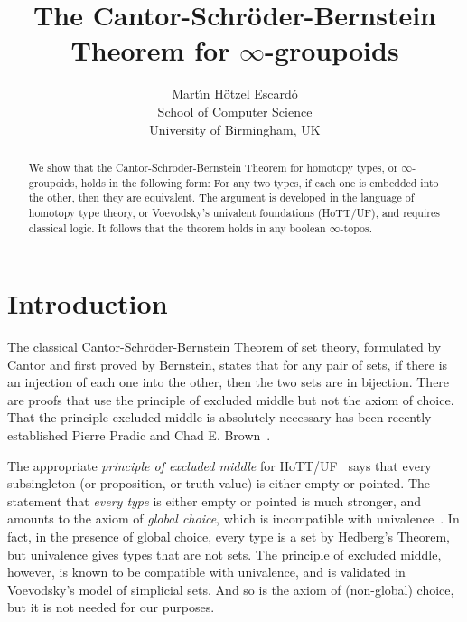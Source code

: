 \documentclass{article}
\title{The Cantor-Schr\"oder-Bernstein Theorem for $\infty$-groupoids}
\author{Mart\'{\i}n H\"otzel Escard\'o
  \\ {\small School of Computer Science}
  \\ {\small University of Birmingham, UK}}
\theoremstyle{definition}
\begin{document}
\maketitle

\begin{abstract}
  We show that the Cantor-Schr\"oder-Bernstein Theorem for homotopy
  types, or $\infty$-groupoids, holds in the following form: For any
  two types, if each one is embedded into the other, then they are
  equivalent. The argument is developed in the language of homotopy
  type theory, or Voevodsky's univalent foundations (HoTT/UF), and
  requires classical logic. It follows that the theorem holds in any
  boolean $\infty$-topos.
\end{abstract}

\section{Introduction}

The classical Cantor-Schr\"oder-Bernstein Theorem of set theory,
formulated by Cantor and first proved by Bernstein, states that for
any pair of sets, if there is an injection of each one into the other,
then the two sets are in bijection.
%
There are proofs that use the principle of excluded middle but not the
axiom of choice. That the principle excluded middle is absolutely
necessary has been recently established Pierre Pradic and Chad
E. Brown~\cite{pradic:brown}.

The appropriate \emph{principle of excluded middle} for
HoTT/UF~\cite{hottbook} says that every subsingleton (or proposition,
or truth value) is either empty or pointed. The statement that
\emph{every type} is either empty or pointed is much stronger, and
amounts to the axiom of \emph{global choice}, which is incompatible
with univalence~\cite[Theorem 3.2.2]{hottbook}. In fact, in the
presence of global choice, every type is a set by Hedberg's Theorem,
but univalence gives types that are not sets. The principle of
excluded middle, however, is known to be compatible with univalence,
and is validated in Voevodsky's model of simplicial sets. And so is
the axiom of (non-global) choice, but it is not needed for our
purposes.
\end{document}
